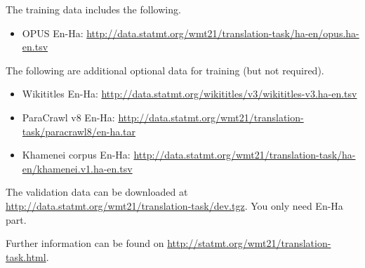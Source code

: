 \documentclass[12pt,letterpaper]{article}
\begin{document}
The training data includes the following.
\begin{itemize}
  \item OPUS En-Ha:
  \url{http://data.statmt.org/wmt21/translation-task/ha-en/opus.ha-en.tsv}
\end{itemize}

The following are additional optional data for training (but not required).
\begin{itemize}
  \item Wikititles En-Ha:
  \url{http://data.statmt.org/wikititles/v3/wikititles-v3.ha-en.tsv}
  \item ParaCrawl v8 En-Ha:
  \url{http://data.statmt.org/wmt21/translation-task/paracrawl8/en-ha.tar}
  \item Khamenei corpus En-Ha:
  \url{http://data.statmt.org/wmt21/translation-task/ha-en/khamenei.v1.ha-en.tsv}
\end{itemize}


The validation data can be downloaded at \url{http://data.statmt.org/wmt21/translation-task/dev.tgz}.
You only need En-Ha part.

Further information can be found on \url{http://statmt.org/wmt21/translation-task.html}.
\end{document}
